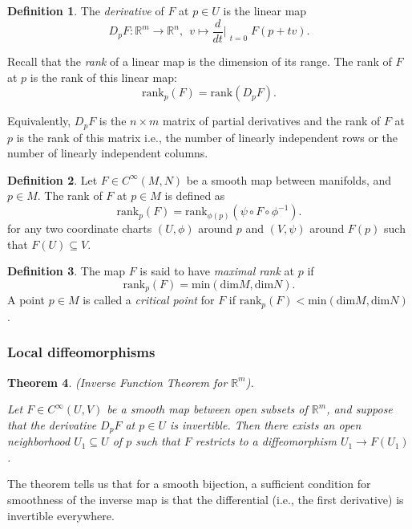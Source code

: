 \documentclass{article}
\newtheorem{theorem}{Theorem}[section]
\theoremstyle{definition}
\newtheorem{defn}[theorem]{Definition}
\newenvironment{definition}
  {\vspace{8pt}\begin{mdframed}[backgroundcolor=blueish,innertopmargin=4]\begin{defn}}
  {\end{defn}\end{mdframed}\vspace{4pt}}
\begin{document}
\begin{definition}
The \textit{derivative} of $F$ at $p \in U$ is the linear map
\[
    D_pF : \mathbb R^m \rightarrow \mathbb R^n, \ \ v \mapsto \frac{d}{dt}\Bigr|_{\substack{ t=0 }} F(p+tv).
\]

Recall that the \textit{rank} of a linear map is the dimension of its range. The rank of $F$ at $p$ is the rank of this linear map:
\[
    \text{rank}_p(F) = \text{rank}(D_p F).
\]
\end{definition}

Equivalently, $D_p F$ is the $n \times m$ matrix of partial derivatives and the rank of $F$ at $p$ is the rank of this matrix i.e., the number of linearly independent rows or the number of linearly independent columns.

\begin{definition}
    Let $F \in C^\infty(M,N)$ be a smooth map between manifolds, and $p \in M$. The rank of $F$ at $p \in M$ is defined as
    \[
        \text{rank}_p(F) = \text{rank}_{\phi(p)}(\psi \circ F \circ \phi^{-1}).
    \]
    for any two coordinate charts $(U,\phi)$ around $p$ and $(V,\psi)$ around $F(p)$ such that $F(U) \subseteq V$.
\end{definition}


\begin{definition}
    The map $F$ is said to have \textit{maximal rank} at $p$ if
    \[
        \text{rank}_p(F) = \text{min}(\text{dim} M, \text{dim} N).
    \]
    A point $p \in M$ is called a \textit{critical point} for $F$ if $\text{rank}_p(F) < \text{min}(\text{dim} M, \text{dim} N)$.
\end{definition}

\subsubsection{Local diffeomorphisms}

\begin{theorem} (Inverse Function Theorem for $\mathbb R^m$).

Let $F \in C^\infty(U,V)$ be a smooth map between open subsets of $\mathbb R^m$, and suppose that the derivative $D_pF$ at $p \in U$ is invertible. Then there exists an open neighborhood $U_1 \subseteq U$ of $p$ such that $F$ restricts to a diffeomorphism $U_1 \rightarrow F(U_1)$.
\end{theorem}

The theorem tells us that for a smooth bijection, a sufficient condition for smoothness of the inverse map is that the differential (i.e., the first derivative) is invertible everywhere.
\end{document}
